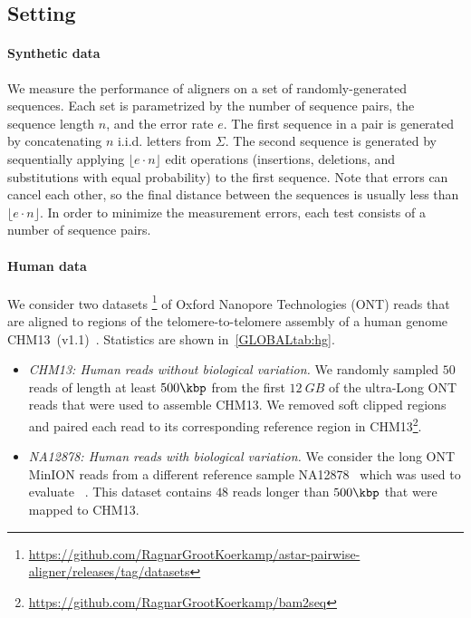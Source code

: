 \subsection{Setting} \label{GLOBALsec:evals-setup}

\paragraph{Synthetic data}
We measure the performance of aligners on a set of randomly-generated sequences.
Each set is parametrized by the number of sequence pairs, the sequence length
$n$, and the error rate $e$. The first sequence in a pair is generated by
concatenating $n$ i.i.d. letters from $\Sigma$. The second sequence is generated
by sequentially applying $\lfloor e{\cdot} n\rfloor$ edit operations (insertions,
deletions, and substitutions with equal probability) to the first sequence. Note
that errors can cancel each other, so the final distance between the sequences
is usually less than $\lfloor e{\cdot} n \rfloor$. In order to minimize the
measurement errors, each test consists of a number of sequence pairs.

\paragraph{Human data}
We consider two datasets%
\footnote{\url{https://github.com/RagnarGrootKoerkamp/astar-pairwise-aligner/releases/tag/datasets}}
of Oxford Nanopore Technologies (ONT) reads that are aligned to regions of the
telomere-to-telomere assembly of a human genome
CHM13~(v1.1)~\citep{nurk2022complete}. Statistics are shown in~\cref{GLOBALtab:hg}.

\begin{itemize}
  \item \emph{CHM13: Human reads without biological variation.} We randomly
        sampled $50$ reads of length at least $500\kbp$ from the first
        $\qty{12}{GB}$ of the ultra-Long ONT reads that were used to assemble
        CHM13. We removed soft clipped regions and paired each read to its
        corresponding reference region in CHM13\footnote{\url{https://github.com/RagnarGrootKoerkamp/bam2seq}}.
  \item \emph{NA12878: Human reads with biological variation.} We consider the
        long ONT MinION reads from a different reference sample
        NA12878~\citep{bowden2019sequencing} which was used to evaluate
        \wfa~\citep{marco2022optimal}. This dataset contains $48$ reads longer than
        $500\kbp$ that were mapped to CHM13.
\end{itemize}

